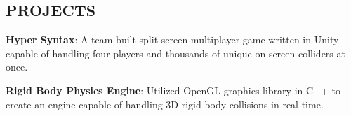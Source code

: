 \documentclass[margin]{res}
\begin{document}
\begin{resume}
\section{PROJECTS}
\phantom{spacing}
\par
\textbf{Hyper Syntax}: 
A team-built split-screen multiplayer game written in Unity capable of handling four players and thousands of unique on-screen colliders at once. 

\par
\textbf{Rigid Body Physics Engine}: 
Utilized OpenGL graphics library in C++ to create an engine capable of handling 3D rigid body collisions in real time. 


\end{resume}
\end{document}
